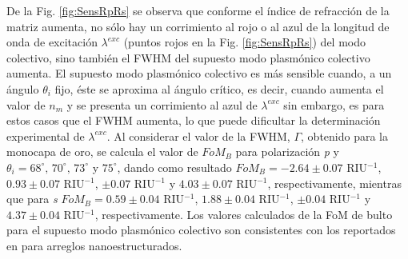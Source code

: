 De la Fig. \ref{fig:SensRpRs} se observa que conforme el índice de refracción de la matriz aumenta, no sólo hay un corrimiento al rojo o al azul de la longitud de onda de excitación $\lambda^{exc}$  (puntos rojos en la Fig. \ref{fig:SensRpRs}) del modo colectivo,  sino también  el FWHM del supuesto modo  plasmónico colectivo aumenta. El supuesto modo  plasmónico colectivo es más sensible cuando, a un ángulo  $\theta_i$ fijo, éste se aproxima al ángulo crítico, es decir, cuando aumenta el valor de $n_m$ y se presenta un corrimiento al azul de $\lambda^{exc}$  sin embargo, es para estos casos que el FWHM aumenta, lo que puede dificultar la determinación experimental de $\lambda^{exc}$. Al considerar el valor de la FWHM, $\Gamma$, obtenido para la monocapa de oro, se calcula el valor de $\textit{FoM}_B$ para polarización \emph{p} y $\theta_i=68^\circ,\, 70^\circ,\, 73^\circ$ y $75^\circ$, dando como resultado  $\textit{FoM}_B= -2.64\pm0.07$ RIU$^{-1}$, $0.93 \pm0.07$ RIU$^{-1}$, $ \pm0.07$ RIU$^{-1}$ y $4.03\pm0.07$ RIU$^{-1}$, respectivamente, mientras que para \emph{s} $\textit{FoM}_B= 0.59\pm0.04$ RIU$^{-1}$, $1.88 \pm0.04$ RIU$^{-1}$, $ \pm0.04 $ RIU$^{-1}$ y $4.37\pm0.04$ RIU$^{-1}$, respectivamente. Los valores calculados de la FoM de bulto para el supuesto modo plasmónico colectivo son consistentes con los reportados en \cite{svedendahl2009refractometric} para arreglos nanoestructurados.

